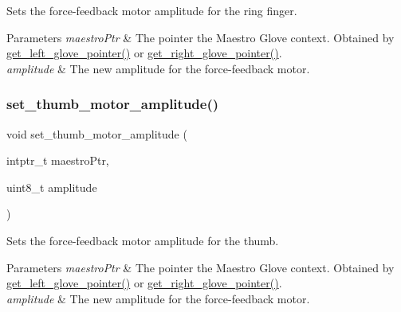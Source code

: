 Sets the force-\/feedback motor amplitude for the ring finger. 
\begin{DoxyParams}{Parameters}
{\em maestro\+Ptr} & The pointer the Maestro Glove context. Obtained by \hyperlink{group__glove_management_ga63ce3c99d4a8b8db851b22af9185764e}{get\+\_\+left\+\_\+glove\+\_\+pointer()} or \hyperlink{group__glove_management_ga9b8fd9d91aeac3f8da50f7a7eba0c32b}{get\+\_\+right\+\_\+glove\+\_\+pointer()}. \\
\hline
{\em amplitude} & The new amplitude for the force-\/feedback motor. \\
\hline
\end{DoxyParams}
\mbox{\label{group__force_feedback_control_gab4d208770cc93f80cb1815fe86e2be31}} 
\subsubsection{\texorpdfstring{set\+\_\+thumb\+\_\+motor\+\_\+amplitude()}{set\_thumb\_motor\_amplitude()}}
{\footnotesize\ttfamily void set\+\_\+thumb\+\_\+motor\+\_\+amplitude (\begin{DoxyParamCaption}\item[{intptr\+\_\+t}]{maestro\+Ptr,  }\item[{uint8\+\_\+t}]{amplitude }\end{DoxyParamCaption})}

Sets the force-\/feedback motor amplitude for the thumb. 
\begin{DoxyParams}{Parameters}
{\em maestro\+Ptr} & The pointer the Maestro Glove context. Obtained by \hyperlink{group__glove_management_ga63ce3c99d4a8b8db851b22af9185764e}{get\+\_\+left\+\_\+glove\+\_\+pointer()} or \hyperlink{group__glove_management_ga9b8fd9d91aeac3f8da50f7a7eba0c32b}{get\+\_\+right\+\_\+glove\+\_\+pointer()}. \\
\hline
{\em amplitude} & The new amplitude for the force-\/feedback motor. \\
\hline
\end{DoxyParams}
